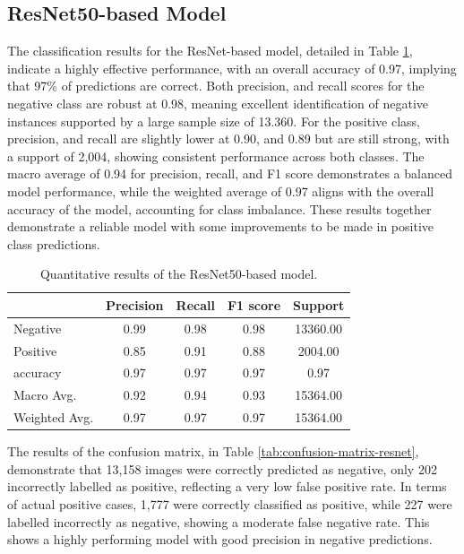 \documentclass[../main]{subfiles}
\begin{document}
\clearpage

\subsection{ResNet50-based Model}
The classification results for the ResNet-based model, detailed in Table \ref{tab:quantitative-results-resnet}, indicate a highly effective performance, with an overall accuracy of 0.97, implying that 97\% of predictions are correct. Both precision, and recall scores for the negative class are robust at 0.98, meaning excellent identification of negative instances supported by a large sample size of 13.360. For the positive class, precision, and recall are slightly lower at 0.90, and 0.89 but are still strong, with a support of 2,004, showing consistent performance across both classes. The macro average of 0.94 for precision, recall, and F1 score demonstrates a balanced model performance, while the weighted average of 0.97 aligns with the overall accuracy of the model, accounting for class imbalance. These results together demonstrate a reliable model with some improvements to be made in positive class predictions.

\begin{table}[h!]
    \centering
    \begin{tabular}{|l|c|c|c|c|}
        \hline
         & Precision & Recall & F1 score & Support \\ \hline
        Negative & 0.99 & 0.98 & 0.98 & 13360.00 \\ \hline
        Positive & 0.85 & 0.91 & 0.88 & 2004.00 \\ \hline
        accuracy & 0.97 & 0.97 & 0.97 & 0.97 \\ \hline
        Macro Avg. & 0.92 & 0.94 & 0.93 & 15364.00 \\ \hline
        Weighted Avg. & 0.97 & 0.97 & 0.97 & 15364.00 \\ \hline
    \end{tabular}
    \caption{Quantitative results of the ResNet50-based model.}
    \label{tab:quantitative-results-resnet}
\end{table}

\noindent The results of the confusion matrix, in Table \ref{tab:confusion-matrix-resnet}, demonstrate that 13,158 images were correctly predicted as negative, only 202 incorrectly labelled as positive, reflecting a very low false positive rate. In terms of actual positive cases, 1,777 were correctly classified as positive, while 227 were labelled incorrectly as negative, showing a moderate false negative rate. This shows a highly performing model with good precision in negative predictions.
\end{document}
